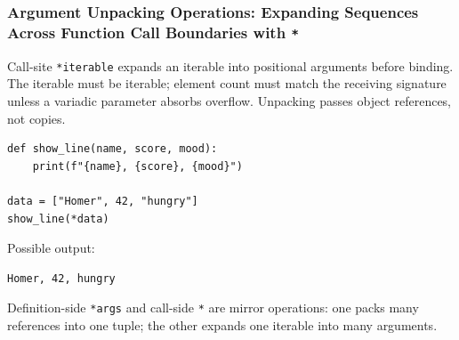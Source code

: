 \subsubsection{Argument Unpacking Operations: Expanding Sequences Across Function Call Boundaries with \texttt{*}}

Call-site \texttt{*iterable} expands an iterable into positional arguments before binding. The iterable must be iterable; element count must match the receiving signature unless a variadic parameter absorbs overflow. Unpacking passes object references, not copies.

\begin{verbatim}
def show_line(name, score, mood):
    print(f"{name}, {score}, {mood}")

data = ["Homer", 42, "hungry"]
show_line(*data)
\end{verbatim}

Possible output:

\begin{verbatim}
Homer, 42, hungry
\end{verbatim}

Definition-side \texttt{*args} and call-side \texttt{*} are mirror operations: one packs many references into one tuple; the other expands one iterable into many arguments.

